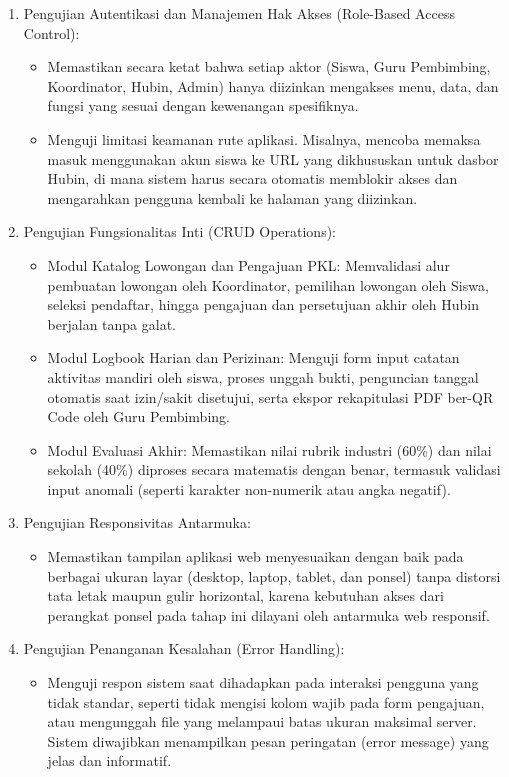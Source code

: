 \begin{enumerate}[label=\alph*.]
\item Pengujian Autentikasi dan Manajemen Hak Akses (Role-Based Access Control):
\begin{itemize}
\item Memastikan secara ketat bahwa setiap aktor (Siswa, Guru Pembimbing, Koordinator, Hubin, Admin) hanya diizinkan mengakses menu, data, dan fungsi yang sesuai dengan kewenangan spesifiknya.
\item Menguji limitasi keamanan rute aplikasi. Misalnya, mencoba memaksa masuk menggunakan akun siswa ke URL yang dikhususkan untuk dasbor Hubin, di mana sistem harus secara otomatis memblokir akses dan mengarahkan pengguna kembali ke halaman yang diizinkan.
\end{itemize}
\item Pengujian Fungsionalitas Inti (CRUD Operations):
\begin{itemize}
\item Modul Katalog Lowongan dan Pengajuan PKL: Memvalidasi alur pembuatan lowongan oleh Koordinator, pemilihan lowongan oleh Siswa, seleksi pendaftar, hingga pengajuan dan persetujuan akhir oleh Hubin berjalan tanpa galat.
\item Modul Logbook Harian dan Perizinan: Menguji form input catatan aktivitas mandiri oleh siswa, proses unggah bukti, penguncian tanggal otomatis saat izin/sakit disetujui, serta ekspor rekapitulasi PDF ber-QR Code oleh Guru Pembimbing.
\item Modul Evaluasi Akhir: Memastikan nilai rubrik industri (60\%) dan nilai sekolah (40\%) diproses secara matematis dengan benar, termasuk validasi input anomali (seperti karakter non-numerik atau angka negatif).
\end{itemize}
\item Pengujian Responsivitas Antarmuka:
\begin{itemize}
\item Memastikan tampilan aplikasi web menyesuaikan dengan baik pada berbagai ukuran layar (desktop, laptop, tablet, dan ponsel) tanpa distorsi tata letak maupun gulir horizontal, karena kebutuhan akses dari perangkat ponsel pada tahap ini dilayani oleh antarmuka web responsif.
\end{itemize}
\item Pengujian Penanganan Kesalahan (Error Handling):
\begin{itemize}
\item Menguji respon sistem saat dihadapkan pada interaksi pengguna yang tidak standar, seperti tidak mengisi kolom wajib pada form pengajuan, atau mengunggah file yang melampaui batas ukuran maksimal server. Sistem diwajibkan menampilkan pesan peringatan (error message) yang jelas dan informatif.
\end{itemize}
\end{enumerate}
